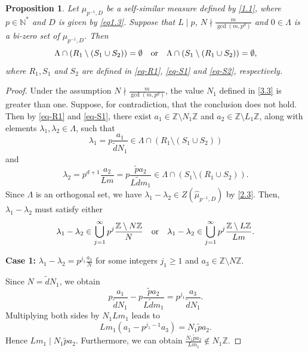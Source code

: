 \documentclass[11pt]{article}
\newtheorem{proposition}[theorem]{Proposition}
\numberwithin{equation}{section}
\begin{document}
\begin{proposition}\label{empty-set}
Let $\mu_{p^{-1},D}$ be a self-similar measure defined by \eqref{1.1}, where $p\in\mathbb{N}^*$ and $D$ is given by \eqref{eq1.3}.  Suppose that $L\mid p$, $N \nmid \frac{m}{\gcd(m, p^d)}$ and $0 \in \Lambda$ is a bi-zero set of $\mu_{p^{-1},D}$. Then
\begin{equation*}
\Lambda\cap (R_1 \setminus (S_1\cup S_2))=\emptyset \quad {\rm{or}} \quad\Lambda\cap (S_1 \setminus (R_1\cup S_2))=\emptyset,
\end{equation*}
where $R_1, S_1$ and $S_2$ are defined in \eqref{eq-R1}, \eqref{eq-S1} and \eqref{eq-S2}, respectively.
\end{proposition}

\begin{proof}
Under the assumption $N \nmid \frac{m}{\gcd(m, p^d)}$, the value $N_1$ defined in \eqref{3.3} is greater than one. 
Suppose, for contradiction, that the conclusion does not hold.
 Then by \eqref{eq-R1} and \eqref{eq-S1}, there exist  $a_1 \in \mathbb{Z} \setminus N_1\mathbb{Z}$  and  $ a_2 \in \mathbb{Z} \setminus L_1\mathbb{Z}$, along with elements
 $ \lambda_1, \lambda_2 \in \Lambda$, such that
\begin{equation}\label{3.10}
 \lambda_1 = p \frac{a_1}{\tilde{d} N_1} \in \Lambda \cap \left( R_1 \setminus (S_1 \cup S_2) \right)
\end{equation}
and
\begin{equation}\label{3.11}
\lambda_2 =p^{d+1} \frac{a_2}{L m}= p \frac{\tilde{p} a_2}{L \tilde{d} m_1} \in \Lambda \cap \left( S_1 \setminus (R_1 \cup S_2) \right).
\end{equation}
Since $ \Lambda$ is an orthogonal set, we have $ \lambda_1 - \lambda_2 \in Z(\hat{\mu}_{p^{-1},D})$ by \eqref{2.3}. Then,
$\lambda_1 - \lambda_2$ must satisfy either
$$\lambda_1-\lambda_2\in \bigcup_{j=1}^{\infty}p^j\frac{\mathbb{Z} \setminus N\mathbb{Z}}{N}\quad {\rm{or}} \quad \lambda_1-\lambda_2\in \bigcup_{j=1}^{\infty}p^j\frac{\mathbb{Z} \setminus L\mathbb{Z}}{Lm}.$$

\textbf{Case 1:} $\lambda_1-\lambda_2 = p^{j_1} \frac{a_3}{N}$ for some integers $j_1\geq 1$ and $a_3 \in \mathbb{Z} \setminus N\mathbb{Z}$.

Since $N = \tilde{d} N_1$, we obtain
$$p \frac{a_1}{\tilde{d}N_1} -p \frac{\tilde{p}a_2}{L\tilde{d}m_1} = p^{j_1} \frac{a_3}{\tilde{d} N_1}.$$
Multiplying both sides by  $N_1Lm_1$  leads to
$$
Lm_1(a_1-p^{j_1-1}a_3)=N_1\tilde{p}a_2.
$$
Hence $L m_1 \mid N_1 \tilde{p} a_2$. Furthermore,  we can obtain $\frac{N_1 \tilde{p} a_2}{L m_1} \notin N_1 \mathbb{Z}.$


\end{proof}
\end{document}
